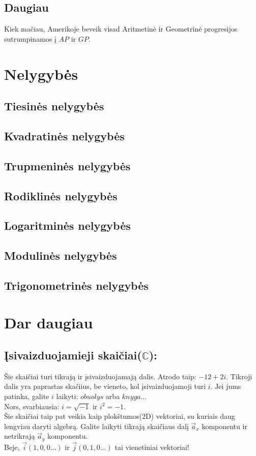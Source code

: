 \documentclass[fleqn]{article} %
\begin{document}
\subsection{Daugiau}
Kiek mačiau, Amerikoje beveik visad Aritmetinė ir Geometrinė progresijos sutrumpinamos į $AP$ ir $GP$.

\section{Nelygybės}
\subsection{Tiesinės nelygybės}
\subsection{Kvadratinės nelygybės}
\subsection{Trupmeninės nelygybės}
\subsection{Rodiklinės nelygybės}
\subsection{Logaritminės nelygybės}
\subsection{Modulinės nelygybės}
\subsection{Trigonometrinės nelygybės}


\section{Dar daugiau}

\subsection{Įsivaizduojamieji skaičiai($\mathbb{C}$):}
Šie skaičiai turi tikrają ir įsivaizduojamają dalis. Atrodo taip: $-12 + 2i$.
Tikroji dalis yra paprastas skačiius, be vieneto, kol įsivaizduojamoji turi $i$. Jei jums patinka, galite $i$ laikyti: $obuolys$ arba $knyga$... \\
Nors, svarbiausia: $i = \sqrt{-1}$ ir $i^2 = -1$. \\
Šie skaičiai taip pat veikia kaip plokštumos(2D) vektoriai, su kuriais daug lengviau daryti algebrą. Galite laikyti tikrają skaičiaus dalį $\vec{a}_x$ komponentu ir netrikrają $\vec{a}_y$ komponentu. \\
Beje, $\vec{i}(1, 0, 0 \dots )$ ir $\vec{j}(0, 1, 0 \dots)$ tai vienetiniai vektoriai!
\end{document}
